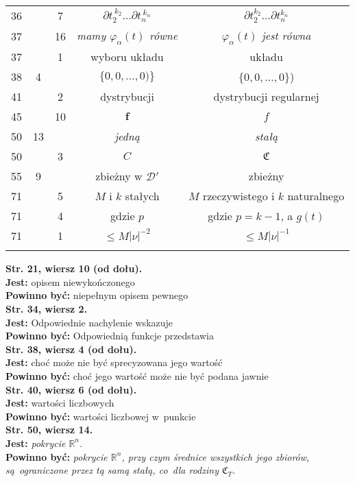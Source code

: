 \documentclass[a4paper,11pt]{article}
\newcommand{\ld}{\ldots}
\newcommand{\mb}{\mathbb}
\newcommand{\mc}{\mathcal}
\newcommand{\mf}{\mathfrak}
\newcommand{\bsym}{\boldsymbol}
\newcommand{\al}{\alpha}
\newcommand{\vp}{\varphi}
\newcommand{\R}{\mb{R}}
\newcommand{\D}{\mc{D}}
\newcommand{\Rn}{\R^{ n }}
\newcommand{\pr}{\partial}
\newcommand{\tb}{\textbf}
\newcommand{\noi}{\noindent}
\newcommand{\StrWg}[2]{\tb{Str. #1, wiersz #2.}}
\newcommand{\StrWd}[2]{\tb{Str. #1, wiersz #2 (od dołu).}}
\newcommand{\Jest}{\tb{Jest: }}
\newcommand{\Pow}{\tb{Powinno być: }}
\begin{document}
\begin{center}
\begin{tabular}{|c|c|c|c|c|}
    36 & & 7 & $\pr t_{ 2 }^{ \: k_{ 2 } } \ld \pr t_{ n }^{ \: k_{ n } }$
           & $\pr t_{ 2 }^{ k_{ 2 } } \ld \pr t_{ n }^{ k_{ n } }$ \\
    37 & & 16 & \emph{mamy $\vp_{ \al }( t )$ równe}
           & \emph{$\vp_{ \al }( t )$ jest równa} \\
    37 & & 1 & wyboru układu & układu \\
    38 & 4 & & $\{ 0, 0, \ld, 0 ) \}$ & $\{ 0, 0, \ld, 0 \}$) \\
    41 & & 2 & dystrybucji & dystrybucji regularnej \\
    45 & & 10 & $\bsym{f}$ & $f$ \\
    50 & 13 & & \emph{jedną} & \emph{stałą} \\
    50 & & 3 & $C$ & $\mf{C}$ \\
    55 & 9 & & zbieżny w $\D'$ & zbieżny \\
    71 & & 5 & $M$ i $k$ stałych & $M$ rzeczywistego i $k$ naturalnego \\
    71 & & 4 & gdzie $p$ & gdzie $p = k - 1$, a $g( t )$\\
    71 & & 1 & $\leq M | \nu |^{ -2 }$ & $\leq M | \nu |^{ -1 }$\\
    & & & & \\ \hline
  \end{tabular}
\end{center}
\noi \StrWd{21}{10} \\
\Jest opisem niewykończonego \\
\Pow niepełnym opisem pewnego \\
\StrWg{34}{2} \\
\Jest Odpowiednie nachylenie wskazuje \\
\Pow Odpowiednią funkcje przedstawia \\
\StrWd{38}{4} \\
\Jest choć może nie być sprecyzowana jego wartość \\
\Pow choć jego wartość może nie być podana jawnie \\
\StrWd{40}{6} \\
\Jest wartości liczbowych \\
\Pow wartości liczbowej w~punkcie \\
\StrWg{50}{14} \\
\Jest \emph{pokrycie $\Rn$.} \\
\Pow \emph{pokrycie $\Rn$, przy czym średnice wszystkich jego zbiorów,
  są~ograniczone przez tą samą stałą, co~dla rodziny $\mf{C}_{ T }$.} \\









 {}
\end{document}
